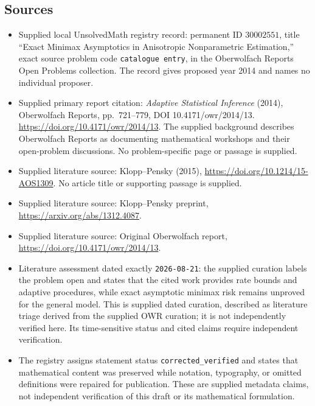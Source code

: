 \documentclass[11pt]{article}
\begin{document}
\subsection{Sources}
\begin{itemize}
\item Supplied local UnsolvedMath registry record: permanent ID \(30002551\), title ``Exact Minimax Asymptotics in Anisotropic Nonparametric Estimation,'' exact source problem code \texttt{catalogue entry}, in the Oberwolfach Reports Open Problems collection. The record gives proposed year 2014 and names no individual proposer.
\item Supplied primary report citation: \emph{Adaptive Statistical Inference} (2014), Oberwolfach Reports, pp.\ 721--779, DOI 10.4171/owr/2014/13. \url{https://doi.org/10.4171/owr/2014/13}. The supplied background describes Oberwolfach Reports as documenting mathematical workshops and their open-problem discussions. No problem-specific page or passage is supplied.
\item Supplied literature source: Klopp--Pensky (2015), \url{https://doi.org/10.1214/15-AOS1309}. No article title or supporting passage is supplied.
\item Supplied literature source: Klopp--Pensky preprint, \url{https://arxiv.org/abs/1312.4087}.
\item Supplied literature source: Original Oberwolfach report, \url{https://doi.org/10.4171/owr/2014/13}.
\item Literature assessment dated exactly \texttt{2026-08-21}: the supplied curation labels the problem open and states that the cited work provides rate bounds and adaptive procedures, while exact asymptotic minimax risk remains unproved for the general model. This is supplied dated curation, described as literature triage derived from the supplied OWR curation; it is not independently verified here. Its time-sensitive status and cited claims require independent verification.
\item The registry assigns statement status \texttt{corrected\_verified} and states that mathematical content was preserved while notation, typography, or omitted definitions were repaired for publication. These are supplied metadata claims, not independent verification of this draft or its mathematical formulation.
\end{itemize}
\end{document}
